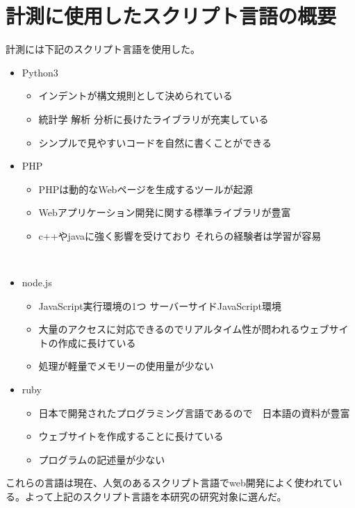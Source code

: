 \chapter{計測に使用したスクリプト言語の概要}
\label{cha:script-language}
計測には下記のスクリプト言語を使用した。
\begin{itemize}
  \item Python3
    \begin{itemize}
      \item インデントが構文規則として決められている
      \item 統計学 解析 分析に長けたライブラリが充実している
      \item シンプルで見やすいコードを自然に書くことができる
    \end{itemize}
  \item PHP
    \begin{itemize}
      \item PHPは動的なWebページを生成するツールが起源
      \item Webアプリケーション開発に関する標準ライブラリが豊富
      \item c++やjavaに強く影響を受けており それらの経験者は学習が容易
    \end{itemize}
　\item node.js
    \begin{itemize}
      \item JavaScript実行環境の1つ サーバーサイドJavaScript環境
      \item 大量のアクセスに対応できるのでリアルタイム性が問われるウェブサイトの作成に長けている
      \item 処理が軽量でメモリーの使用量が少ない
    \end{itemize}
  \item ruby
    \begin{itemize}
      \item 日本で開発されたプログラミング言語であるので　日本語の資料が豊富
      \item ウェブサイトを作成することに長けている
      \item プログラムの記述量が少ない
    \end{itemize}
\end{itemize}
これらの言語は現在、人気のあるスクリプト言語でweb開発によく使われている。よって上記のスクリプト言語を本研究の研究対象に選んだ。
